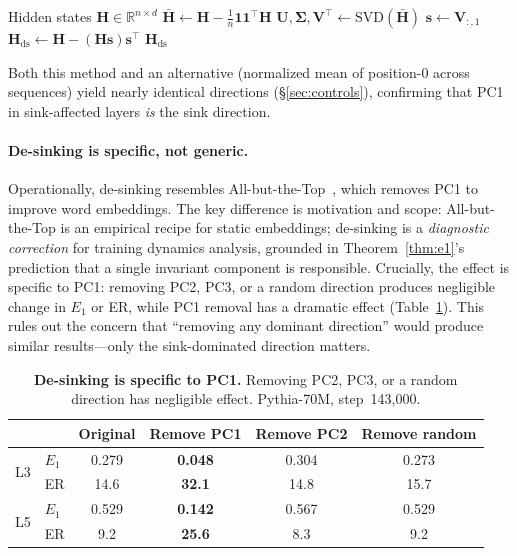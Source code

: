 \documentclass[11pt]{article}
\begin{document}
\begin{algorithm}[t]
\caption{De-sinking}\label{alg:desink}
\begin{algorithmic}[1]
\REQUIRE Hidden states $\mathbf{H} \in \mathbb{R}^{n \times d}$
\STATE $\bar{\mathbf{H}} \leftarrow \mathbf{H} - \frac{1}{n}\mathbf{1}\mathbf{1}^\top\mathbf{H}$ 
\STATE $\mathbf{U}, \mathbf{\Sigma}, \mathbf{V}^\top \leftarrow \text{SVD}(\bar{\mathbf{H}})$ 
\STATE $\mathbf{s} \leftarrow \mathbf{V}_{:,1}$ 
\STATE $\mathbf{H}_{\text{ds}} \leftarrow \mathbf{H} - (\mathbf{H}\mathbf{s})\mathbf{s}^\top$ 
\RETURN $\mathbf{H}_{\text{ds}}$
\end{algorithmic}
\end{algorithm}

Both this method and an alternative (normalized mean of position-0 across sequences) yield nearly identical directions (\S\ref{sec:controls}), confirming that PC1 in sink-affected layers \emph{is} the sink direction.

\paragraph{De-sinking is specific, not generic.}
Operationally, de-sinking resembles All-but-the-Top~\citep{mu2018allbutthetop}, which removes PC1 to improve word embeddings.
The key difference is motivation and scope: All-but-the-Top is an empirical recipe for static embeddings; de-sinking is a \emph{diagnostic correction} for training dynamics analysis, grounded in Theorem~\ref{thm:e1}'s prediction that a single invariant component is responsible.
Crucially, the effect is specific to PC1: removing PC2, PC3, or a random direction produces negligible change in $E_1$ or ER, while PC1 removal has a dramatic effect (Table~\ref{tab:specificity}).
This rules out the concern that ``removing any dominant direction'' would produce similar results---only the sink-dominated direction matters.

\begin{table}[t]
\centering
\caption{\textbf{De-sinking is specific to PC1.} Removing PC2, PC3, or a random direction has negligible effect. Pythia-70M, step~143{,}000.}
\label{tab:specificity}
\small
\begin{tabular}{@{}llcccc@{}}
\toprule
& & \textbf{Original} & \textbf{Remove PC1} & \textbf{Remove PC2} & \textbf{Remove random} \\
\midrule
\multirow{2}{*}{L3} & $E_1$ & 0.279 & \textbf{0.048} & 0.304 & 0.273 \\
& ER & 14.6 & \textbf{32.1} & 14.8 & 15.7 \\
\midrule
\multirow{2}{*}{L5} & $E_1$ & 0.529 & \textbf{0.142} & 0.567 & 0.529 \\
& ER & 9.2 & \textbf{25.6} & 8.3 & 9.2 \\
\bottomrule
\end{tabular}
\end{table}
\end{document}
